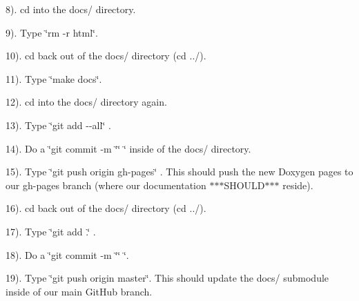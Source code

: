 8). cd into the docs/ directory.

9). Type \char`\"{}rm -\/r html\char`\"{}.

10). cd back out of the docs/ directory (cd ../).

11). Type \char`\"{}make docs\char`\"{}.

12). cd into the docs/ directory again.

13). Type \char`\"{}git add -\/-\/all\char`\"{} .

14). Do a \char`\"{}git commit -\/m \char`\"{}\char`\"{} \char`\"{} inside of the docs/ directory.

15). Type \char`\"{}git push origin gh-\/pages\char`\"{} . This should push the new Doxygen pages to our gh-\/pages branch (where our documentation $\ast$$\ast$$\ast$\-S\-H\-O\-U\-L\-D$\ast$$\ast$$\ast$ reside).

16). cd back out of the docs/ directory (cd ../).

17). Type \char`\"{}git add .\char`\"{} .

18). Do a \char`\"{}git commit -\/m \char`\"{}\char`\"{} \char`\"{}.

19). Type \char`\"{}git push origin master\char`\"{}. This should update the docs/ submodule inside of our main Git\-Hub branch. 
